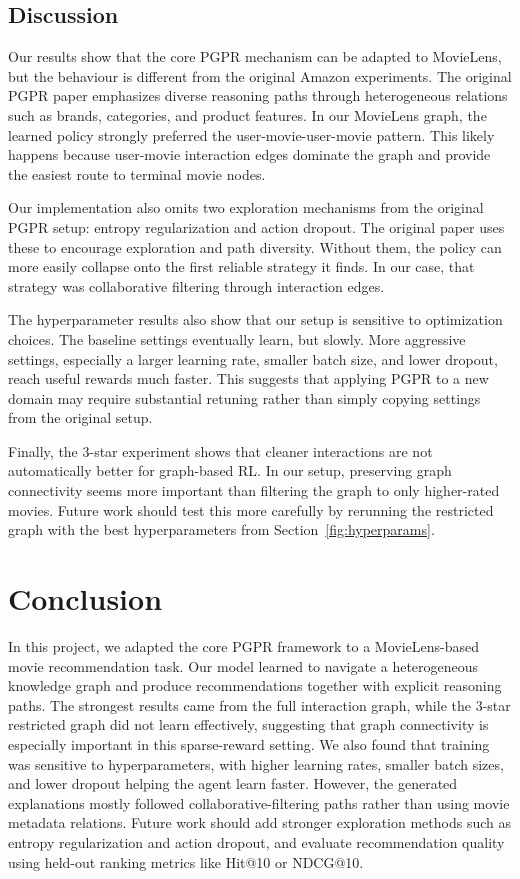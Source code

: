 \documentclass{article}
\begin{document}
\subsection{Discussion}

Our results show that the core PGPR mechanism can be adapted to MovieLens, but the behaviour is different from the original Amazon experiments. The original PGPR paper emphasizes diverse reasoning paths through heterogeneous relations such as brands, categories, and product features. In our MovieLens graph, the learned policy strongly preferred the user-movie-user-movie pattern. This likely happens because user-movie interaction edges dominate the graph and provide the easiest route to terminal movie nodes.

Our implementation also omits two exploration mechanisms from the original PGPR setup: entropy regularization and action dropout. The original paper uses these to encourage exploration and path diversity. Without them, the policy can more easily collapse onto the first reliable strategy it finds. In our case, that strategy was collaborative filtering through interaction edges.

The hyperparameter results also show that our setup is sensitive to optimization choices. The baseline settings eventually learn, but slowly. More aggressive settings, especially a larger learning rate, smaller batch size, and lower dropout, reach useful rewards much faster. This suggests that applying PGPR to a new domain may require substantial retuning rather than simply copying settings from the original setup.

Finally, the 3-star experiment shows that cleaner interactions are not automatically better for graph-based RL. In our setup, preserving graph connectivity seems more important than filtering the graph to only higher-rated movies. Future work should test this more carefully by rerunning the restricted graph with the best hyperparameters from Section~\ref{fig:hyperparams}.

\section{Conclusion}

In this project, we adapted the core PGPR framework to a MovieLens-based movie recommendation task. Our model learned to navigate a heterogeneous knowledge graph and produce recommendations together with explicit reasoning paths. The strongest results came from the full interaction graph, while the 3-star restricted graph did not learn effectively, suggesting that graph connectivity is especially important in this sparse-reward setting. We also found that training was sensitive to hyperparameters, with higher learning rates, smaller batch sizes, and lower dropout helping the agent learn faster. However, the generated explanations mostly followed collaborative-filtering paths rather than using movie metadata relations. Future work should add stronger exploration methods such as entropy regularization and action dropout, and evaluate recommendation quality using held-out ranking metrics like Hit@10 or NDCG@10.
\end{document}
